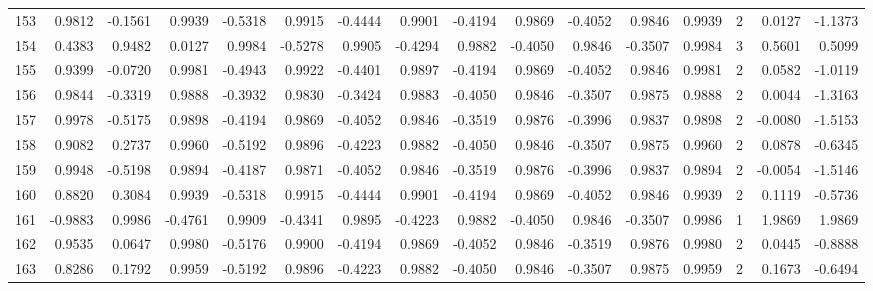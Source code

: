 \begin{tabular}{lrrrrrrrrrrrrrrr}
153 &      0.9812 & -0.1561 &  0.9939 & -0.5318 &  0.9915 & -0.4444 &  0.9901 & -0.4194 &  0.9869 & -0.4052 &   0.9846 &     0.9939 &      2 &                    0.0127 &                    -1.1373 \\
154 &      0.4383 &  0.9482 &  0.0127 &  0.9984 & -0.5278 &  0.9905 & -0.4294 &  0.9882 & -0.4050 &  0.9846 &  -0.3507 &     0.9984 &      3 &                    0.5601 &                     0.5099 \\
155 &      0.9399 & -0.0720 &  0.9981 & -0.4943 &  0.9922 & -0.4401 &  0.9897 & -0.4194 &  0.9869 & -0.4052 &   0.9846 &     0.9981 &      2 &                    0.0582 &                    -1.0119 \\
156 &      0.9844 & -0.3319 &  0.9888 & -0.3932 &  0.9830 & -0.3424 &  0.9883 & -0.4050 &  0.9846 & -0.3507 &   0.9875 &     0.9888 &      2 &                    0.0044 &                    -1.3163 \\
157 &      0.9978 & -0.5175 &  0.9898 & -0.4194 &  0.9869 & -0.4052 &  0.9846 & -0.3519 &  0.9876 & -0.3996 &   0.9837 &     0.9898 &      2 &                   -0.0080 &                    -1.5153 \\
158 &      0.9082 &  0.2737 &  0.9960 & -0.5192 &  0.9896 & -0.4223 &  0.9882 & -0.4050 &  0.9846 & -0.3507 &   0.9875 &     0.9960 &      2 &                    0.0878 &                    -0.6345 \\
159 &      0.9948 & -0.5198 &  0.9894 & -0.4187 &  0.9871 & -0.4052 &  0.9846 & -0.3519 &  0.9876 & -0.3996 &   0.9837 &     0.9894 &      2 &                   -0.0054 &                    -1.5146 \\
160 &      0.8820 &  0.3084 &  0.9939 & -0.5318 &  0.9915 & -0.4444 &  0.9901 & -0.4194 &  0.9869 & -0.4052 &   0.9846 &     0.9939 &      2 &                    0.1119 &                    -0.5736 \\
161 &     -0.9883 &  0.9986 & -0.4761 &  0.9909 & -0.4341 &  0.9895 & -0.4223 &  0.9882 & -0.4050 &  0.9846 &  -0.3507 &     0.9986 &      1 &                    1.9869 &                     1.9869 \\
162 &      0.9535 &  0.0647 &  0.9980 & -0.5176 &  0.9900 & -0.4194 &  0.9869 & -0.4052 &  0.9846 & -0.3519 &   0.9876 &     0.9980 &      2 &                    0.0445 &                    -0.8888 \\
163 &      0.8286 &  0.1792 &  0.9959 & -0.5192 &  0.9896 & -0.4223 &  0.9882 & -0.4050 &  0.9846 & -0.3507 &   0.9875 &     0.9959 &      2 &                    0.1673 &                    -0.6494 \\

\end{tabular}
